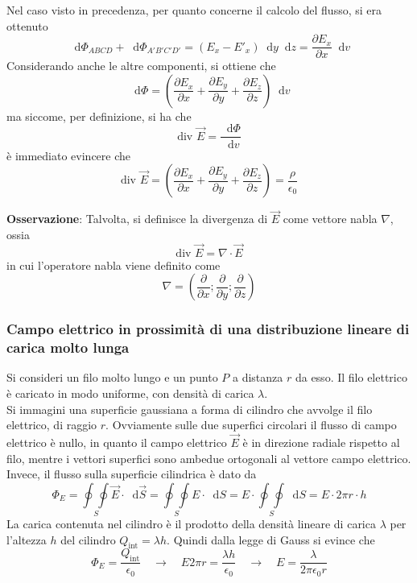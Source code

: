 \documentclass[a4paper]{extarticle}
\newcommand\dif{\mathop{}\!\mathrm{d}}
\begin{document}
\vspace{1em}
\noindent
Nel caso visto in precedenza, per quanto concerne il calcolo del flusso, si era ottenuto
\[\dif \Phi_{ABCD} + \dif \Phi_{A'B'C'D'} = \left(E_x-E'_x\right) \dif y \dif z = \frac{\partial E_x}{\partial x} \dif v\]
Considerando anche le altre componenti, si ottiene che
\[\dif \Phi = \left(\frac{\partial E_x}{\partial x} + \frac{\partial E_y}{\partial y} + \frac{\partial E_z}{\partial z}\right) \dif v\]
ma siccome, per definizione, si ha che
\[\text{div } \vec E = \frac{\dif \Phi}{\dif v}\]
è immediato evincere che
\[\text{div } \vec E = \left(\frac{\partial E_x}{\partial x} + \frac{\partial E_y}{\partial y} + \frac{\partial E_z}{\partial z}\right) = \frac{\rho}{\epsilon_0}\]

\vspace{1em}
\noindent
\textbf{Osservazione}: Talvolta, si definisce la divergenza di $\vec E$ come vettore nabla $\nabla$, ossia
\[\text{div } \vec E = \nabla \cdot \vec E\]
in cui l'operatore nabla viene definito come
\[\nabla = \left(\frac{\partial}{\partial x}; \frac{\partial}{\partial y};\frac{\partial}{\partial z}\right)\]

\newpage
\noindent
\subsubsection{Campo elettrico in prossimità di una distribuzione lineare di carica molto lunga}
Si consideri un filo molto lungo e un punto $P$ a distanza $r$ da esso. Il filo elettrico è caricato in modo uniforme, con densità di carica $\lambda$.\\
Si immagini una superficie gaussiana a forma di cilindro che avvolge il filo elettrico, di raggio $r$. Ovviamente sulle due superfici circolari il flusso di campo elettrico è nullo, in quanto il campo elettrico $\vec E$ è in direzione radiale rispetto al filo, mentre i vettori superfici sono ambedue ortogonali al vettore campo elettrico.\\
Invece, il flusso sulla superficie cilindrica è dato da
\[\Phi_E = \underset{S}{\oint \oint} \vec E \cdot \dif \vec S = \underset{S}{\oint \oint} E \cdot \dif S = E \cdot \underset{S}{\oint \oint}  \dif S = E \cdot 2\pi r \cdot h\]
La carica contenuta nel cilindro è il prodotto della densità lineare di carica $\lambda$ per l'altezza $h$ del cilindro $Q_\text{int} = \lambda h$. Quindi dalla legge di Gauss si evince che
\[\Phi_E = \frac{Q_\text{int}}{\epsilon_0} \hspace{1em} \rightarrow \hspace{1em} E 2 \pi r = \frac{\lambda h}{\epsilon_0} \hspace{1em} \rightarrow \hspace{1em} E = \frac{\lambda}{2 \pi \epsilon_0 r}\]
\end{document}

